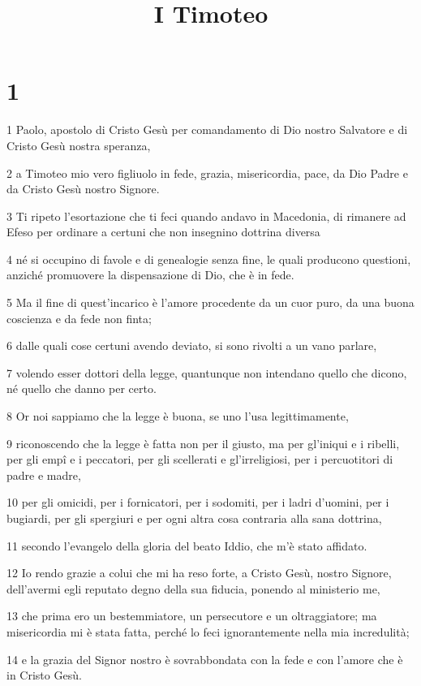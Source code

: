 

\title{I Timoteo}


\chapter{1}

\par 1 Paolo, apostolo di Cristo Gesù per comandamento di Dio nostro Salvatore e di Cristo Gesù nostra speranza,
\par 2 a Timoteo mio vero figliuolo in fede, grazia, misericordia, pace, da Dio Padre e da Cristo Gesù nostro Signore.
\par 3 Ti ripeto l'esortazione che ti feci quando andavo in Macedonia, di rimanere ad Efeso per ordinare a certuni che non insegnino dottrina diversa
\par 4 né si occupino di favole e di genealogie senza fine, le quali producono questioni, anziché promuovere la dispensazione di Dio, che è in fede.
\par 5 Ma il fine di quest'incarico è l'amore procedente da un cuor puro, da una buona coscienza e da fede non finta;
\par 6 dalle quali cose certuni avendo deviato, si sono rivolti a un vano parlare,
\par 7 volendo esser dottori della legge, quantunque non intendano quello che dicono, né quello che danno per certo.
\par 8 Or noi sappiamo che la legge è buona, se uno l'usa legittimamente,
\par 9 riconoscendo che la legge è fatta non per il giusto, ma per gl'iniqui e i ribelli, per gli empî e i peccatori, per gli scellerati e gl'irreligiosi, per i percuotitori di padre e madre,
\par 10 per gli omicidi, per i fornicatori, per i sodomiti, per i ladri d'uomini, per i bugiardi, per gli spergiuri e per ogni altra cosa contraria alla sana dottrina,
\par 11 secondo l'evangelo della gloria del beato Iddio, che m'è stato affidato.
\par 12 Io rendo grazie a colui che mi ha reso forte, a Cristo Gesù, nostro Signore, dell'avermi egli reputato degno della sua fiducia, ponendo al ministerio me,
\par 13 che prima ero un bestemmiatore, un persecutore e un oltraggiatore; ma misericordia mi è stata fatta, perché lo feci ignorantemente nella mia incredulità;
\par 14 e la grazia del Signor nostro è sovrabbondata con la fede e con l'amore che è in Cristo Gesù.
